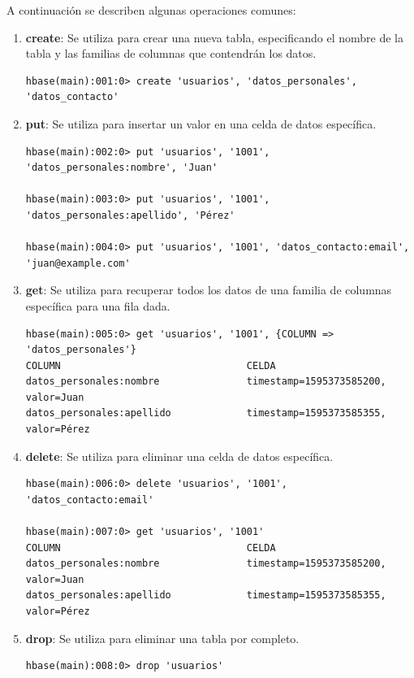 \documentclass[pdflatex,sn-mathphys-num]{sn-jnl}
\theoremstyle{thmstyleone}%
\theoremstyle{thmstyletwo}%
\theoremstyle{thmstylethree}%
\begin{document}
A continuación se describen algunas operaciones comunes:

\begin{enumerate}
    \item \textbf{create}: Se utiliza para crear una nueva tabla, especificando el nombre de la tabla y las familias de columnas que contendrán los datos.
    
    \begin{verbatim}
hbase(main):001:0> create 'usuarios', 'datos_personales', 'datos_contacto'
    \end{verbatim}

    \vspace{-0.25cm}
    
    \item \textbf{put}: Se utiliza para insertar un valor en una celda de datos específica.
    \begin{verbatim}
hbase(main):002:0> put 'usuarios', '1001', 'datos_personales:nombre', 'Juan'

hbase(main):003:0> put 'usuarios', '1001', 'datos_personales:apellido', 'Pérez'

hbase(main):004:0> put 'usuarios', '1001', 'datos_contacto:email', 'juan@example.com'
    \end{verbatim}

    \vspace{-0.25cm}
    
    \item \textbf{get}: Se utiliza para recuperar todos los datos de una familia de columnas específica para una fila dada.
    \begin{verbatim}
hbase(main):005:0> get 'usuarios', '1001', {COLUMN => 'datos_personales'}
COLUMN                                CELDA
datos_personales:nombre               timestamp=1595373585200, valor=Juan
datos_personales:apellido             timestamp=1595373585355, valor=Pérez
    \end{verbatim}

    \vspace{-0.25cm}
    
    \item \textbf{delete}: Se utiliza para eliminar una celda de datos específica.
    \begin{verbatim}
hbase(main):006:0> delete 'usuarios', '1001', 'datos_contacto:email'

hbase(main):007:0> get 'usuarios', '1001'
COLUMN                                CELDA
datos_personales:nombre               timestamp=1595373585200, valor=Juan
datos_personales:apellido             timestamp=1595373585355, valor=Pérez
    \end{verbatim}

    \vspace{-0.25cm}
    
    \item \textbf{drop}: Se utiliza para eliminar una tabla por completo.
    \begin{verbatim}
hbase(main):008:0> drop 'usuarios'
    \end{verbatim}
\end{enumerate}
\end{document}

